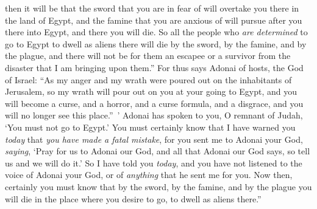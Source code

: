 \begin{biblechapter}
\verse then it will be that the sword that you are in fear of will overtake you there in the land of Egypt, and the famine that you are anxious of will pursue after you there into Egypt, and there you will die.
\verse So all the people who \textit{are determined} to go to Egypt to dwell as aliens there will die by the sword, by the famine, and by the plague, and there will not be for them an escapee or a survivor from the disaster that I am bringing upon them.”
\verse For thus says Adonai of hosts, the God of Israel: “As my anger and my wrath were poured out on the inhabitants of Jerusalem, so my wrath will pour out on you at your going to Egypt, and you will become a curse, and a horror, and a curse formula, and a disgrace, and you will no longer see this place.” ’
\verse Adonai has spoken to you, O remnant of Judah, ‘You must not go to Egypt.’ You must certainly know that I have warned you \textit{today}
\verse that \textit{you have made a fatal mistake}, for you sent me to Adonai your God, \textit{saying}, ‘Pray for us to Adonai our God, and all that Adonai our God says, so tell us and we will do it.’
\verse So I have told you \textit{today}, and you have not listened to the voice of Adonai your God, or of \textit{anything} that he sent me for you.
\verse Now then, certainly you must know that by the sword, by the famine, and by the plague you will die in the place where you desire to go, to dwell as aliens there.”
\end{biblechapter}

